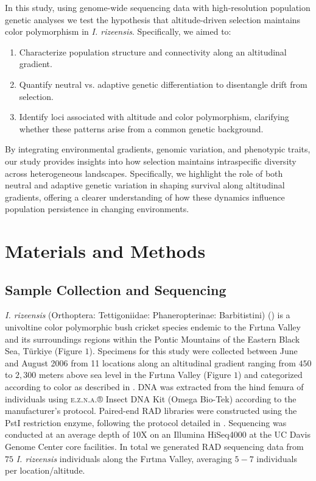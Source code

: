 \documentclass[9pt,a4paper,twoside]{rho-class/rho}
\begin{document}
    In this study, using genome-wide sequencing data with high-resolution population genetic analyses we test the hypothesis that altitude-driven selection maintains color polymorphism in \textit{I. rizeensis}. Specifically, we aimed to: 
  
    \begin{enumerate}
    \item Characterize population structure and connectivity along an altitudinal gradient.
    \item Quantify neutral vs. adaptive genetic differentiation to disentangle drift from selection.
    \item Identify loci associated with altitude and color polymorphism, clarifying whether these patterns arise from a common genetic background.
    \end{enumerate}

    By integrating environmental gradients, genomic variation, and phenotypic traits, our study provides insights into how selection maintains intraspecific diversity across heterogeneous landscapes. Specifically, we highlight the role of both neutral and adaptive genetic variation in shaping survival along altitudinal gradients, offering a clearer understanding of how these dynamics influence population persistence in changing environments.

\section{Materials and Methods}

    \subsection{Sample Collection and Sequencing}

       \textit{I. rizeensis} (Orthoptera: Tettigoniidae: Phaneropterinae: Barbitistini) (\cite{SEVGILI2003}) is a univoltine color polymorphic bush cricket species endemic to the Fırtına Valley and its surroundings regions within the Pontic Mountains of the Eastern Black Sea, Türkiye (Figure $1$). Specimens for this study were collected between June and August 2006 from 11 locations along an altitudinal gradient ranging from $450$ to $2,300$ meters above sea level in the Fırtına Valley (Figure $1$) and categorized according to color as described in \cite{Çağlar2014}. DNA was extracted from the hind femura of individuals using \textsc{e.z.n.a.}® Insect DNA Kit (Omega Bio-Tek) according to the manufacturer’s protocol. Paired-end RAD libraries were constructed using the PstI restriction enzyme, following the protocol detailed in \cite{Ali2016}. Sequencing was conducted at an average depth of 10X on an Illumina HiSeq4000 at the UC Davis Genome Center core facilities. In total we generated RAD sequencing data from $75$ \textit{I. rizeensis} individuals along the Fırtına Valley, averaging $5-7$ individuals per location/altitude.
    
\end{document}
